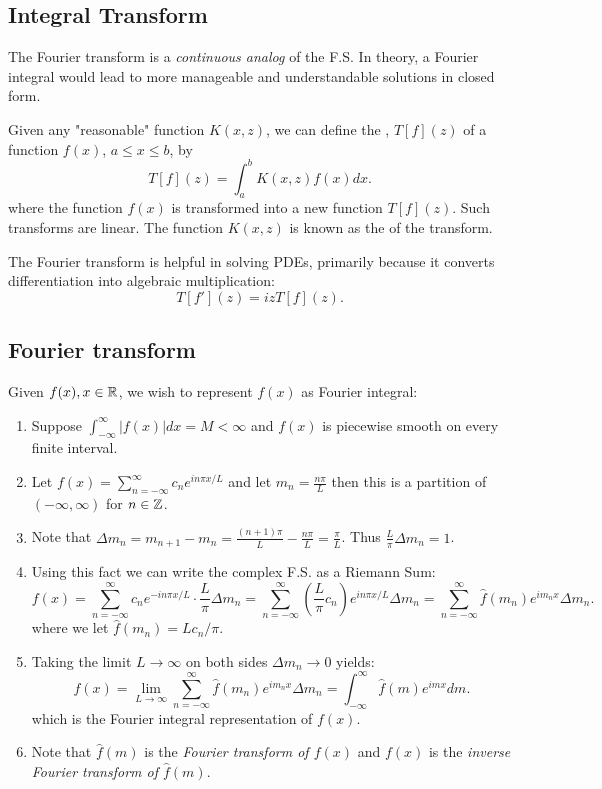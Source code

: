 \documentclass[class=article,crop=false]{standalone}
\begin{document}
\subsection{Integral Transform}

The Fourier transform is a \emph{continuous analog} of the F.S. In theory, a Fourier integral would lead to more manageable and understandable solutions in closed form.

\begin{defn}[]
	Given any "reasonable" function $ K(x,z)$, we can define the  , $ T[f](z)$ of a function  $ f(x)$,  $ a\leq x\leq b$, by
	 \[
		 T[f](z) = \int_{a}^{b} K(x,z) f(x) dx 
	.\] 
	where the function $ f(x)$ is transformed into a new function  $ T[f](z)$. Such transforms are linear. The function  $ K(x,z)$ is known as the   of the transform. 
\end{defn}

\begin{remark}
The Fourier transform is helpful in solving PDEs, primarily because it converts differentiation into algebraic multiplication:
\[
	T[f'](z) = iz T[f](z)
.\] 
\end{remark}

\subsection{Fourier transform}
Given $ f(x), x \in \mathbb{R}$, we wish to represent $ f(x)$ as Fourier integral:
 \begin{enumerate}[label=\arabic*)]
	 \item Suppose $ \int_{-\infty}^{\infty} |f(x)|dx =M < \infty$ and $ f(x)$ is piecewise smooth on every finite interval.
	 \item Let  $ f(x) = \sum_{ n=-\infty}^{\infty} c_n e^{in\pi x /L} $ and let $m_n =\frac{n\pi}{L }$ then this is a partition of $ (-\infty,\infty)$ for $ n \in \mathbb{Z}$.
	 \item Note that $ \Delta m_n=m_{n+1}-m_n = \frac{(n+1)\pi}{L } - \frac{n\pi}{L } = \frac{\pi}{L}$. Thus $ \frac{L}{\pi} \Delta m_n =1$.
	 \item Using this fact we can write the complex F.S. as a Riemann Sum:
		 \[
			 f(x) = \sum_{ n=-\infty}^{\infty} c_n e^{-in\pi x /L} \cdot \frac{L}{\pi} \Delta m_n = \sum_{ n= -\infty}^{\infty}  \left( \frac{L}{\pi} c_n \right) e^{i n\pi x /L} \Delta m_n = \sum_{ n=-\infty}^{\infty} \hat{ f}(m_n)e^{im_n x} \Delta m_n 
		 .\] 
		 where we let $ \hat{ f}(m_n) = L c_n / \pi$. 
	 \item Taking the limit $ L \to \infty$ on both sides $ \Delta m_n \to 0$ yields:
		 \[
			 f(x) = \lim_{ L \to \infty} \sum_{ n= -\infty}^{\infty} \hat{ f}(m_n) e^{i  m_n x} \Delta m_n = \int_{-\infty}^{\infty} \hat{ f}(m) e^{imx} dm
		 .\] 
		 which is the Fourier integral representation of $ f(x)$.
	 \item Note that $ \hat{ f}(m)$ is the \emph{Fourier transform of $ f(x)$} and $ f(x)$ is the  \emph{inverse Fourier transform of $ \hat{ f}(m)$}.  
\end{enumerate}
\end{document}
